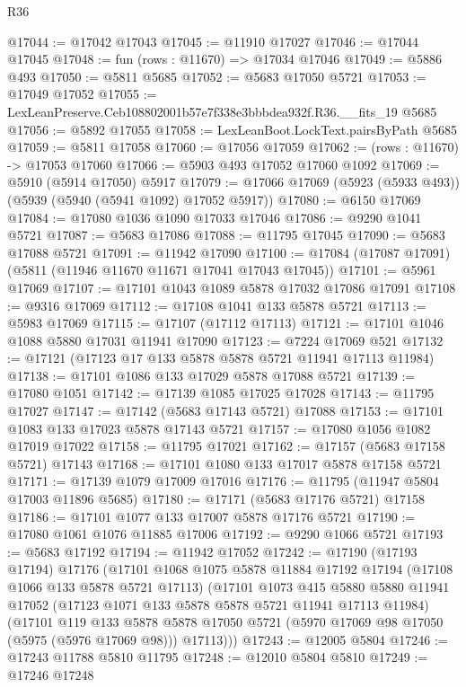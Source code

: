 \begin{lexlean}{R36}
\begin{coremodule}
@17044 := @17042 @17043
@17045 := @11910 @17027
@17046 := @17044 @17045
@17048 := fun (rows : @11670) => @17034 @17046
@17049 := @5886 @493
@17050 := @5811 @5685
@17052 := @5683 @17050 @5721
@17053 := @17049 @17052
@17055 := LexLeanPreserve.Ceb108802001b57e7f338e3bbbdea932f.R36.__fits_19 @5685
@17056 := @5892 @17055
@17058 := LexLeanBoot.LockText.pairsByPath @5685
@17059 := @5811 @17058
@17060 := @17056 @17059
@17062 := (rows : @11670) -> @17053 @17060
@17066 := @5903 @493 @17052 @17060 @1092
@17069 := @5910 (@5914 @17050) @5917
@17079 := @17066 @17069 (@5923 (@5933 @493)) (@5939 (@5940 (@5941 @1092) @17052 @5917))
@17080 := @6150 @17069
@17084 := @17080 @1036 @1090 @17033 @17046
@17086 := @9290 @1041 @5721
@17087 := @5683 @17086
@17088 := @11795 @17045
@17090 := @5683 @17088 @5721
@17091 := @11942 @17090
@17100 := @17084 (@17087 @17091) (@5811 (@11946 @11670 @11671 @17041 @17043 @17045))
@17101 := @5961 @17069
@17107 := @17101 @1043 @1089 @5878 @17032 @17086 @17091
@17108 := @9316 @17069
@17112 := @17108 @1041 @133 @5878 @5721
@17113 := @5983 @17069
@17115 := @17107 (@17112 @17113)
@17121 := @17101 @1046 @1088 @5880 @17031 @11941 @17090
@17123 := @7224 @17069 @521
@17132 := @17121 (@17123 @17 @133 @5878 @5878 @5721 @11941 @17113 @11984)
@17138 := @17101 @1086 @133 @17029 @5878 @17088 @5721
@17139 := @17080 @1051
@17142 := @17139 @1085 @17025 @17028
@17143 := @11795 @17027
@17147 := @17142 (@5683 @17143 @5721) @17088
@17153 := @17101 @1083 @133 @17023 @5878 @17143 @5721
@17157 := @17080 @1056 @1082 @17019 @17022
@17158 := @11795 @17021
@17162 := @17157 (@5683 @17158 @5721) @17143
@17168 := @17101 @1080 @133 @17017 @5878 @17158 @5721
@17171 := @17139 @1079 @17009 @17016
@17176 := @11795 (@11947 @5804 @17003 @11896 @5685)
@17180 := @17171 (@5683 @17176 @5721) @17158
@17186 := @17101 @1077 @133 @17007 @5878 @17176 @5721
@17190 := @17080 @1061 @1076 @11885 @17006
@17192 := @9290 @1066 @5721
@17193 := @5683 @17192
@17194 := @11942 @17052
@17242 := @17190
    (@17193 @17194)
    @17176
    (@17101
      @1068
      @1075
      @5878
      @11884
      @17192
      @17194
      (@17108 @1066 @133 @5878 @5721 @17113)
      (@17101
        @1073
        @415
        @5880
        @5880
        @11941
        @17052
        (@17123 @1071 @133 @5878 @5878 @5721 @11941 @17113 @11984)
        (@17101
          @119
          @133
          @5878
          @5878
          @17050
          @5721
          (@5970 @17069 @98 @17050 (@5975 (@5976 @17069 @98)))
          @17113)))
@17243 := @12005 @5804
@17246 := @17243 @11788 @5810 @11795
@17248 := @12010 @5804 @5810
@17249 := @17246 @17248

\end{coremodule}
\end{lexlean}
